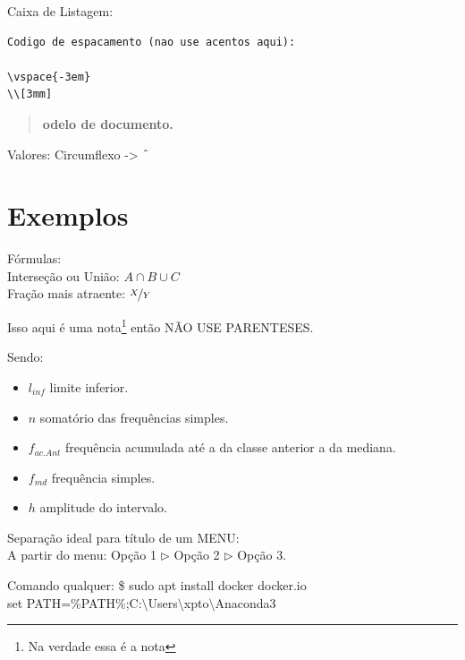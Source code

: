 \documentclass[a4paper,11pt]{article}
\begin{document}
Caixa de Listagem:
\begin{lstlisting}[]
Codigo de espacamento (nao use acentos aqui):

\vspace{-3em}
\\[3mm]
\end{lstlisting}

	
\maketitle %
\thispagestyle{fancy} %

\begin{abstract}
	\textbf{odelo de documento. \lipsum[4-1]}
\end{abstract}

Valores:
Circumflexo -> $\string^$

\section{Exemplos}

Fórmulas: \\
Interseção ou União: $A \cap B \cup C$ \\
Fração mais atraente: $\nicefrac{X}{Y}$ 

Isso aqui é uma nota\footnote{Na verdade essa é a nota} então NÃO USE PARENTESES.

Sendo: \vspace{-1em}
\begin{itemize}[nolistsep]
	\item $l_{inf}$ limite inferior.
	\item $n$ somatório das frequências simples.
	\item $f_{ac.Ant}$ frequência acumulada até a da classe anterior a da mediana.
	\item $f_{md}$ frequência simples.
	\item $h$ amplitude do intervalo.
\end{itemize}

Separação ideal para título de um MENU: \\
A partir do menu: Opção 1 $\triangleright$ Opção 2 $\triangleright$ Opção 3.

Comando qualquer:
{\ttfamily\$ sudo apt install docker docker.io} \\
{\ttfamily set PATH=\%PATH\%;C:$\setminus$Users$\setminus$xpto$\setminus$Anaconda3}
\end{document}
